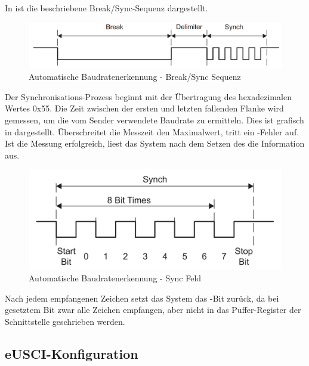 \newpage
In  ist die beschriebene Break/Sync-Sequenz dargestellt.

\begin{figure}[h!]
	\centering
	\includegraphics[width=1.0\textwidth]{../Bilder/auto_baud.png}
	\caption{Automatische Baudratenerkennung - Break/Sync Sequenz\\}
	\label{fig:auto_baud}
\end{figure}

Der Synchronisations-Prozess beginnt mit der \"Ubertragung des hexadezimalen Wertes 0x55. Die Zeit zwischen der ersten und letzten fallenden Flanke wird gemessen, um die vom Sender verwendete Baudrate zu ermitteln. Dies ist grafisch in  dargestellt. \"Uberschreitet die Messzeit den Maximalwert, tritt ein -Fehler auf. Ist die Messung erfolgreich, liest das System nach dem Setzen des  die Information aus. 

\begin{figure}[h!]
	\centering
	\includegraphics[width=1.0\textwidth]{../Bilder/sync_field.png}
	\caption{Automatische Baudratenerkennung - Sync Feld\\}
	\label{fig:sync_field}
\end{figure}

Nach jedem empfangenen Zeichen setzt das System das -Bit zur\"uck, da bei gesetztem Bit zwar alle Zeichen empfangen, aber nicht in das Puffer-Register der Schnittstelle geschrieben werden. 

\subsection{eUSCI-Konfiguration}
\label{sec:eUSCI_Konfiguration}

